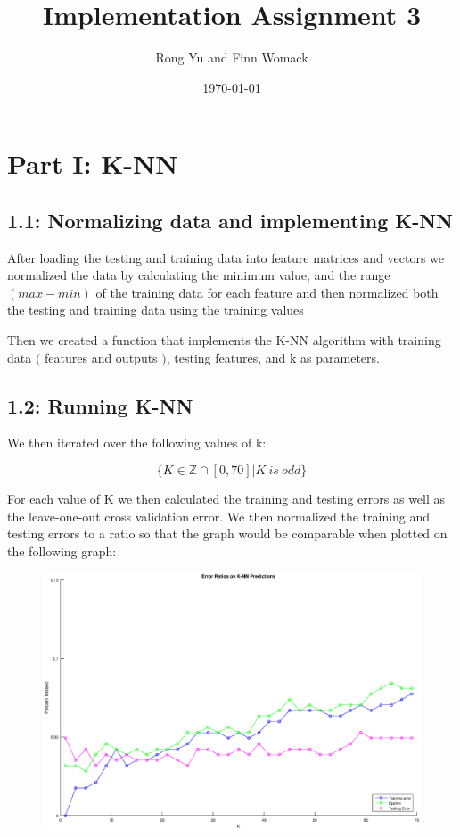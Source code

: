 \documentclass{article}
\title{Implementation Assignment 3}
\date{\today}
\author{Rong Yu and Finn Womack}
\begin{document}
	\maketitle
	\section*{Part I: K-NN}
	\subsection*{1.1: Normalizing data and implementing K-NN}
After loading the testing and training data into feature matrices and vectors we normalized the data by calculating the minimum value, and the range $(max - min)$ of the training data for each feature and then normalized both the testing and training data using the training values
	
	Then we created a function that implements the K-NN algorithm with training data $($ features and outputs $)$, testing features, and k as parameters.
	
	\subsection*{1.2: Running K-NN}
	We then iterated over the following values of k:
	
	$$
	\{ K \in \mathbb{Z} \cap [0,70] | K \ is \ odd \}
	$$
	
	For each value of K we then calculated the training and testing errors as well as the leave-one-out cross validation error. We then normalized the training and testing errors to a ratio so that the graph would be comparable when plotted on the following graph:
	
	\newpage
	
	\begin{figure}[h!]
		\begin{center} 
			\includegraphics[scale=0.4]{knn.eps} 
		\end{center} 
		\label{fig:M1}
	\end{figure}
	
\end{document}
